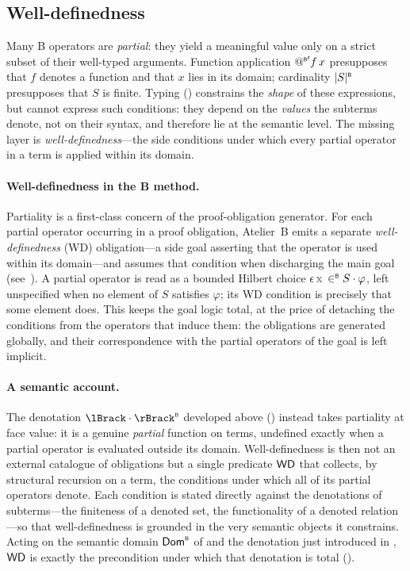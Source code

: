 \subsection{Well-definedness}
\label{sec:b-wd}

Many B operators are \emph{partial}: they yield a meaningful value only on a strict subset
of their well-typed arguments. Function application \(\mathord{@^{\scriptscriptstyle{\mathsf{B}}}\mkern-1mu}' f\,x\) presupposes that \(f\)
denotes a function and that \(x\) lies in its domain; cardinality \(\lvert S \rvert^{\scriptscriptstyle{\mathsf{B}}}\) presupposes
that \(S\) is finite. Typing () constrains the \emph{shape} of these
expressions, but cannot express such conditions: they depend on the \emph{values} the
subterms denote, not on their syntax, and therefore lie at the semantic level.
The missing layer is \emph{well-definedness}---the
side conditions under which every partial operator in a term is applied within its domain.

\paragraph{Well-definedness in the B method.}
Partiality is a first-class concern of the proof-obligation generator. For each partial
operator occurring in a proof obligation, Atelier~B emits a separate \emph{well-definedness}
(WD) obligation---a side goal asserting that the operator is used within its domain---and
assumes that condition when discharging the main goal~\cite{abrial1996bbook}
(see~). A partial operator is read as a bounded Hilbert choice
\(\epsilon\,\var{x} \inB S \cdot \varphi\), left unspecified when no element of \(S\) satisfies
\(\varphi\); its WD condition is precisely that some element does. This keeps the goal logic
total, at the price of detaching the conditions from the operators that induce them: the
obligations are generated globally, and their correspondence with the partial operators of
the goal is left implicit.

\paragraph{A semantic account.}
The denotation \(\interpB{\cdot}\) developed above () instead takes partiality
at face value: it is a genuine \emph{partial} function on terms, undefined exactly when a partial
operator is evaluated outside its domain. Well-definedness is then not an external catalogue of
obligations but a single predicate \(\mathsf{WD}\) that collects, by structural recursion on
a term, the conditions under which all of its partial operators denote. Each condition is stated
directly against the denotations of subterms---the finiteness of a denoted set, the functionality
of a denoted relation---so that well-definedness is grounded in the very semantic objects it
constrains. Acting on the semantic domain \({\mathsf{Dom}^{\scriptscriptstyle{\mathsf{B}}}}\) of  and the denotation
just introduced in , \(\mathsf{WD}\) is exactly the precondition under which that
denotation is total ().

